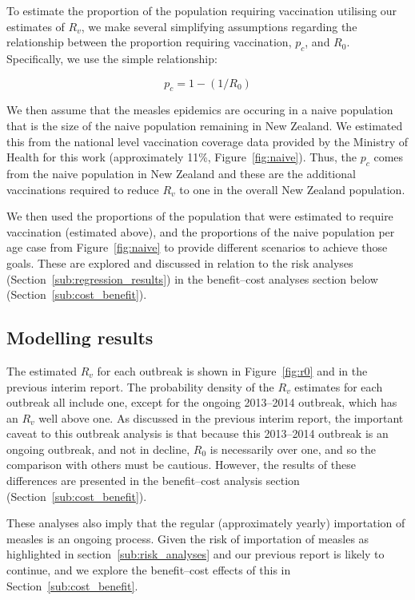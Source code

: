\documentclass{article}
\begin{document}
To estimate the proportion of the population requiring vaccination utilising our estimates of $R_v$, we make several simplifying assumptions regarding the relationship between the proportion requiring vaccination, $p_c$, and $R_0$. Specifically, we use the simple relationship:

\begin{equation} \label{eq:pc}
p_c = 1-(1/R_0)
  \end{equation}

We then assume that the measles epidemics are occuring in a naive population that is the size of the naive population remaining in New Zealand. We estimated this from the national level vaccination coverage data provided by the Ministry of Health for this work (approximately 11\%, Figure~\ref{fig:naive}). Thus, the $p_c$ comes from the naive population in New Zealand and these are the additional vaccinations required to reduce $R_v$ to one in the overall New Zealand population.

We then used the proportions of the population that were estimated to require vaccination (estimated above), and the proportions of the naive population per age case from Figure~\ref{fig:naive} to provide different scenarios to achieve those goals. These are explored and discussed in relation to the risk analyses (Section~\ref{sub:regression_results}) in the benefit--cost analyses section below (Section~\ref{sub:cost_benefit}).

\subsection{Modelling results}

The estimated $R_v$ for each outbreak is shown in Figure~\ref{fig:r0} and in the previous interim report. The probability density of the $R_v$ estimates for each outbreak all include one, except for the ongoing 2013--2014 outbreak, which has an $R_v$ well above one. As discussed in the previous interim report, the important caveat to this outbreak analysis is that because this 2013--2014 outbreak is an ongoing outbreak, and not in decline, $R_0$ is necessarily over one, and so the comparison with others must be cautious. However, the results of these differences are presented in the benefit--cost analysis section (Section~\ref{sub:cost_benefit}).

These analyses also imply that the regular (approximately yearly) importation of measles is an ongoing process. Given the risk of importation of measles as highlighted in section~\ref{sub:risk_analyses} and our previous report is likely to continue, and we explore the benefit--cost effects of this in Section~\ref{sub:cost_benefit}. 
\end{document}
